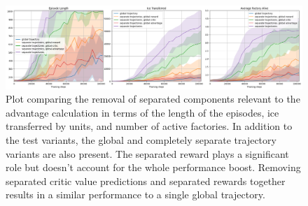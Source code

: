 \begin{figure}[htbp]
    \centering
    \includegraphics[width=1\linewidth]{images/results_hybrid/components/combined_rew.png}
    \captionsetup{justification=justified, singlelinecheck=false, width=1\linewidth, labelfont=bf} 
    \caption[]{Plot comparing the removal of separated components relevant to the advantage calculation in terms of the length of the episodes, ice transferred by units, and number of active factories. In addition to the test variants, the global and completely separate trajectory variants are also present. The separated reward plays a significant role but doesn't account for the whole performance boost. Removing separated critic value predictions and separated rewards together results in a similar performance to a single global trajectory.}
    \label{fig:hybrid_results/components/combined_rew}
\end{figure}

